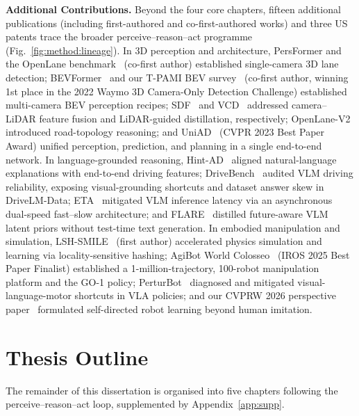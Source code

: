 \medskip
\noindent\textbf{Additional Contributions.}
Beyond the four core chapters, fifteen additional publications (including first-authored and co-first-authored works) and three US patents trace the broader perceive--reason--act programme (Fig.~\ref{fig:method:lineage}). In 3D perception and architecture, PersFormer and the OpenLane benchmark~\cite{chen2022persformer} (co-first author) established single-camera 3D lane detection; BEVFormer~\cite{li2022bevformer} and our T-PAMI BEV survey~\cite{li2023bevdevils} (co-first author, winning 1st place in the 2022 Waymo 3D Camera-Only Detection Challenge) established multi-camera BEV perception recipes; SDF~\cite{gao2023sdf} and VCD~\cite{huang2023vcd} addressed camera--LiDAR feature fusion and LiDAR-guided distillation, respectively; OpenLane-V2~\cite{wang2023openlanev2} introduced road-topology reasoning; and UniAD~\cite{hu2023uniad} (CVPR 2023 Best Paper Award) unified perception, prediction, and planning in a single end-to-end network. In language-grounded reasoning, Hint-AD~\cite{ding2024hint} aligned natural-language explanations with end-to-end driving features; DriveBench~\cite{xie2025vlms} audited VLM driving reliability, exposing visual-grounding shortcuts and dataset answer skew in DriveLM-Data; ETA~\cite{hamdan2025eta} mitigated VLM inference latency via an asynchronous dual-speed fast--slow architecture; and FLARE~\cite{xie2026flare} distilled future-aware VLM latent priors without test-time text generation. In embodied manipulation and simulation, LSH-SMILE~\cite{sima2021lshsmile} (first author) accelerated physics simulation and learning via locality-sensitive hashing; AgiBot World Colosseo~\cite{bu2025agibot_iros} (IROS 2025 Best Paper Finalist) established a 1-million-trajectory, 100-robot manipulation platform and the GO-1 policy; PerturBot~\cite{liu2026perturbot} diagnosed and mitigated visual-language-motor shortcuts in VLA policies; and our CVPRW 2026 perspective paper~\cite{chen2025robot} formulated self-directed robot learning beyond human imitation.

\section{Thesis Outline}\label{sec:intro:outline}

The remainder of this dissertation is organised into five chapters following the perceive--reason--act loop, supplemented by Appendix~\ref{app:supp}.

